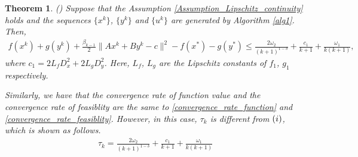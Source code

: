 \documentclass{article}
\numberwithin{equation}{section}
\newtheorem{theorem}{Theorem}[section]
\begin{document}
\begin{theorem}
    () Suppose that the Assumption \ref{Assumption_Lipschitz_continuity} holds and the sequences 
    $\{x^k\}$, $\{y^k\}$ and $\{u^k\}$ are generated by Algorithm \ref{alg1}. Then, 
    \begin{align}
        f(x^{k}) + g(y^{k}) +\frac{\beta_{k-1}}{2}\|Ax^k+By^k-c\rVert^2 - f(x^*) -g(y^*)  
        \leq \frac{2\omega_2}{(k+1)^{1-\delta}} +\frac{c_1}{k+1} +\frac{\omega_1}{k(k+1)}, \nonumber
    \end{align}
    where $c_1 = 2L_fD_x^2+ 2L_gD_y^2$. Here, $L_f$, $L_g$ are the Lipschitz constants of $f_1$, $g_1$ respectively. 
    
    Similarly, we have that the convergence rate of function value 
    and the convergence rate of feasiblity are the same to  \eqref{convergence_rate_function} and \eqref{convergence_rate_feasiblity}. 
    However, in this case, $\tau_k$ is different from $(\romannumeral1)$, which is shown as follows. 
    \begin{align}
        \tau_k = \frac{2\omega_2}{(k+1)^{1-\delta}} +\frac{c_1}{k+1} +\frac{\omega_1}{k(k+1)} \nonumber
    \end{align}
\end{theorem}
\end{document}
